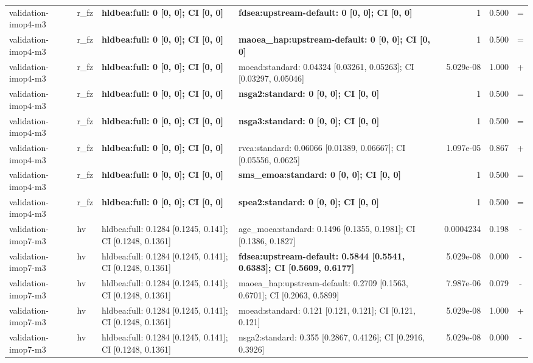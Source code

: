\begin{tabular}{llllrrc}
validation-imop4-m3 & r\_fz & \textbf{hldbea:full: 0 [0, 0]; CI [0, 0]} & \textbf{fdsea:upstream-default: 0 [0, 0]; CI [0, 0]} & 1 & 0.500 & = \\
validation-imop4-m3 & r\_fz & \textbf{hldbea:full: 0 [0, 0]; CI [0, 0]} & \textbf{maoea\_hap:upstream-default: 0 [0, 0]; CI [0, 0]} & 1 & 0.500 & = \\
validation-imop4-m3 & r\_fz & \textbf{hldbea:full: 0 [0, 0]; CI [0, 0]} & moead:standard: 0.04324 [0.03261, 0.05263]; CI [0.03297, 0.05046] & 5.029e-08 & 1.000 & + \\
validation-imop4-m3 & r\_fz & \textbf{hldbea:full: 0 [0, 0]; CI [0, 0]} & \textbf{nsga2:standard: 0 [0, 0]; CI [0, 0]} & 1 & 0.500 & = \\
validation-imop4-m3 & r\_fz & \textbf{hldbea:full: 0 [0, 0]; CI [0, 0]} & \textbf{nsga3:standard: 0 [0, 0]; CI [0, 0]} & 1 & 0.500 & = \\
validation-imop4-m3 & r\_fz & \textbf{hldbea:full: 0 [0, 0]; CI [0, 0]} & rvea:standard: 0.06066 [0.01389, 0.06667]; CI [0.05556, 0.0625] & 1.097e-05 & 0.867 & + \\
validation-imop4-m3 & r\_fz & \textbf{hldbea:full: 0 [0, 0]; CI [0, 0]} & \textbf{sms\_emoa:standard: 0 [0, 0]; CI [0, 0]} & 1 & 0.500 & = \\
validation-imop4-m3 & r\_fz & \textbf{hldbea:full: 0 [0, 0]; CI [0, 0]} & \textbf{spea2:standard: 0 [0, 0]; CI [0, 0]} & 1 & 0.500 & = \\
validation-imop7-m3 & hv & hldbea:full: 0.1284 [0.1245, 0.141]; CI [0.1248, 0.1361] & age\_moea:standard: 0.1496 [0.1355, 0.1981]; CI [0.1386, 0.1827] & 0.0004234 & 0.198 & - \\
validation-imop7-m3 & hv & hldbea:full: 0.1284 [0.1245, 0.141]; CI [0.1248, 0.1361] & \textbf{fdsea:upstream-default: 0.5844 [0.5541, 0.6383]; CI [0.5609, 0.6177]} & 5.029e-08 & 0.000 & - \\
validation-imop7-m3 & hv & hldbea:full: 0.1284 [0.1245, 0.141]; CI [0.1248, 0.1361] & maoea\_hap:upstream-default: 0.2709 [0.1563, 0.6701]; CI [0.2063, 0.5899] & 7.987e-06 & 0.079 & - \\
validation-imop7-m3 & hv & hldbea:full: 0.1284 [0.1245, 0.141]; CI [0.1248, 0.1361] & moead:standard: 0.121 [0.121, 0.121]; CI [0.121, 0.121] & 5.029e-08 & 1.000 & + \\
validation-imop7-m3 & hv & hldbea:full: 0.1284 [0.1245, 0.141]; CI [0.1248, 0.1361] & nsga2:standard: 0.355 [0.2867, 0.4126]; CI [0.2916, 0.3926] & 5.029e-08 & 0.000 & - \\

\end{tabular}
